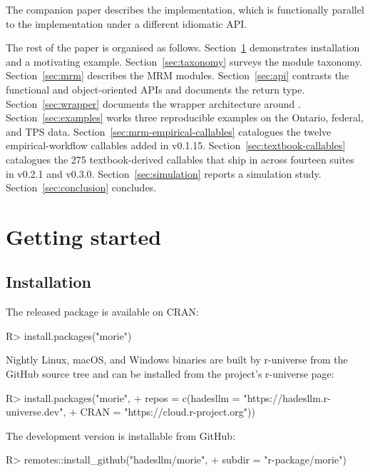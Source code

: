 \documentclass[article,shortnames,nojss]{jss}
\begin{document}
The companion paper \citep{Ruhela2026MoriePy} describes the
 implementation, which is functionally parallel
to the  implementation under a different idiomatic
API.

The rest of the paper is organised as follows.
Section~\ref{sec:getting-started} demonstrates installation and a
motivating example. Section~\ref{sec:taxonomy} surveys the module
taxonomy. Section~\ref{sec:mrm} describes the MRM modules.
Section~\ref{sec:api} contrasts the functional and
object-oriented APIs and documents the 
return type.  Section~\ref{sec:wrapper} documents the wrapper architecture
around . Section~\ref{sec:examples} works three
reproducible examples on the Ontario, federal, and TPS data.
Section~\ref{sec:mrm-empirical-callables} catalogues the
twelve empirical-workflow callables added in v0.1.15.
Section~\ref{sec:textbook-callables} catalogues the 275
textbook-derived callables that ship in  across
fourteen suites in v0.2.1 and v0.3.0.
Section~\ref{sec:simulation} reports a simulation study.
Section~\ref{sec:conclusion} concludes.

\section{Getting started}
\label{sec:getting-started}

\subsection{Installation}

The released  package is available on CRAN:

\begin{Code}
R> install.packages("morie")
\end{Code}

\noindent Nightly Linux, macOS, and Windows binaries are built by
r-universe \citep{Ooms2021runiverse} from the GitHub source tree
and can be installed from the project's r-universe page:

\begin{Code}
R> install.packages("morie",
+   repos = c(hadesllm = "https://hadesllm.r-universe.dev",
+             CRAN     = "https://cloud.r-project.org"))
\end{Code}

\noindent The development version is installable from GitHub:

\begin{Code}
R> remotes::install_github("hadesllm/morie",
+   subdir = "r-package/morie")
\end{Code}
\end{document}
